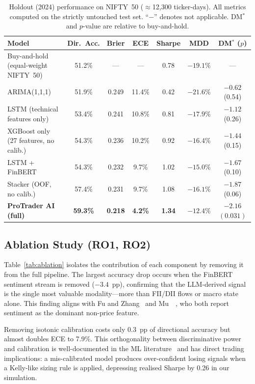 \begin{table}[t]
\centering
\caption{Holdout (2024) performance on NIFTY~50 ($\approx$12{,}300 ticker-days).
All metrics computed on the strictly untouched test set. ``$-$'' denotes
not applicable.  DM$^*$ and $p$-value are relative to buy-and-hold.}
\label{tab:main}
\begin{tabular}{lcccccc}
\toprule
\textbf{Model} & \textbf{Dir.\ Acc.} & \textbf{Brier} & \textbf{ECE}
  & \textbf{Sharpe} & \textbf{MDD} & \textbf{DM$^*$ ($p$)} \\
\midrule
Buy-and-hold (equal-weight NIFTY~50)       & 51.2\% & --- & ---   & 0.78 & $-19.1\%$ & --- \\
ARIMA(1,1,1)                               & 51.9\% & 0.249 & 11.4\% & 0.42 & $-21.6\%$ & $-0.62$ (0.54) \\
LSTM (technical features only)             & 53.4\% & 0.241 & 10.8\% & 0.81 & $-17.9\%$ & $-1.12$ (0.26) \\
XGBoost only (27 features, no calib.)      & 54.3\% & 0.236 & 10.2\% & 0.92 & $-16.4\%$ & $-1.44$ (0.15) \\
LSTM + FinBERT~\cite{moodi2024fusion}      & 54.3\% & 0.232 & 9.7\%  & 1.02 & $-15.0\%$ & $-1.67$ (0.10) \\
Stacker (OOF, no calib.)                   & 57.4\% & 0.231 & 9.7\%  & 1.08 & $-16.1\%$ & $-1.87$ (0.06) \\
\textbf{ProTrader AI (full)}               & \textbf{59.3\%} & \textbf{0.218} & \textbf{4.2\%}
  & \textbf{1.34} & $\mathbf{-12.4\%}$ & $\mathbf{-2.16}$ $(\mathbf{0.031})$ \\
\bottomrule
\end{tabular}
\end{table}

\subsection{Ablation Study (RO1, RO2)}

Table~\ref{tab:ablation} isolates the contribution of each component by
removing it from the full pipeline. The largest accuracy drop occurs when
the FinBERT sentiment stream is removed ($-3.4$~pp), confirming that the
LLM-derived signal is the single most valuable modality---more than FII/DII
flows or macro state alone. This finding aligns with Fu and
Zhang~\cite{fu2024multisource} and Mu~\etal~\cite{mu2023investor}, who both
report sentiment as the dominant non-price feature.

Removing isotonic calibration costs only 0.3~pp of directional accuracy but
almost doubles ECE to 7.9\%. This orthogonality between discriminative power
and calibration is well-documented in the ML literature~\cite{zadrozny2002transforming}
and has direct trading implications: a mis-calibrated model produces
over-confident losing signals when a Kelly-like sizing rule is applied,
depressing realised Sharpe by 0.26 in our simulation.

